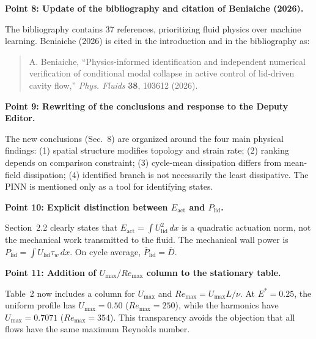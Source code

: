 \documentclass[11pt,a4paper]{article}
\begin{document}
\noindent\textbf{Point 8: Update of the bibliography and citation of Beniaiche
(2026).}

The bibliography contains 37 references, prioritizing fluid physics over machine
learning. Beniaiche (2026) is cited in the introduction and in the
bibliography as:

\begin{quote}
A. Beniaiche, ``Physics-informed identification and independent numerical
verification of conditional modal collapse in active control of lid-driven
cavity flow,'' \textit{Phys. Fluids} \textbf{38}, 103612 (2026).
\end{quote}

\vspace{0.5em}

\noindent\textbf{Point 9: Rewriting of the conclusions and response to the
Deputy Editor.}

The new conclusions (Sec.~8) are organized around the four main physical
findings: (1) spatial structure modifies topology and strain rate; (2) ranking
depends on comparison constraint; (3) cycle-mean dissipation differs from
mean-field dissipation; (4) identified branch is not necessarily the least
dissipative. The PINN is mentioned only as a tool for identifying states.

\vspace{0.5em}

\noindent\textbf{Point 10: Explicit distinction between $E_{\mathrm{act}}$ and
$P_{\mathrm{lid}}$.}

Section~2.2 clearly states that $E_{\mathrm{act}} = \int
U_{\mathrm{lid}}^2 \, dx$ is a quadratic actuation norm, not the mechanical
work transmitted to the fluid. The mechanical wall power is $P_{\mathrm{lid}} =
\int U_{\mathrm{lid}} \tau_w \, dx$. On cycle average, $\overline{P}_{\mathrm{lid}}
= \overline{D}$.

\vspace{0.5em}

\noindent\textbf{Point 11: Addition of $U_{\max}/Re_{\max}$ column to the
stationary table.}

Table~2 now includes a column for $U_{\max}$ and $Re_{\max} = U_{\max} L / \nu$.
At $E^* = 0.25$, the uniform profile has $U_{\max} = 0.50$ ($Re_{\max} = 250$),
while the harmonics have $U_{\max} = 0.7071$ ($Re_{\max} = 354$). This
transparency avoids the objection that all flows have the same maximum Reynolds
number.

\vspace{0.5em}
\end{document}
